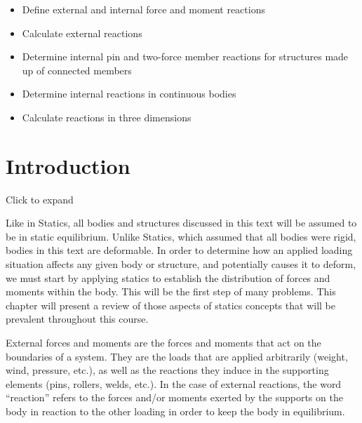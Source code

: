 \documentclass[
  letterpaper,
  DIV=11,
  numbers=noendperiod]{scrreprt}
\providecommand{\tightlist}{%
  \setlength{\itemsep}{0pt}\setlength{\parskip}{0pt}}\usepackage{longtable,booktabs,array}
\theoremstyle{definition}
\theoremstyle{remark}
\begin{document}
\begin{tcolorbox}[enhanced jigsaw, leftrule=.75mm, bottomrule=.15mm, opacityback=0, opacitybacktitle=0.6, colframe=quarto-callout-note-color-frame, toprule=.15mm, colbacktitle=quarto-callout-note-color!10!white, coltitle=black, bottomtitle=1mm, title={Learning Objectives}, titlerule=0mm, toptitle=1mm, colback=white, rightrule=.15mm, left=2mm, arc=.35mm, breakable]

\begin{itemize}
\tightlist
\item
  Define external and internal force and moment reactions
\item
  Calculate external reactions
\item
  Determine internal pin and two-force member reactions for structures
  made up of connected members
\item
  Determine internal reactions in continuous bodies
\item
  Calculate reactions in three dimensions
\end{itemize}

\end{tcolorbox}

\section*{Introduction}\label{introduction}


Click to expand

Like in Statics, all bodies and structures discussed in this text will
be assumed to be in static equilibrium. Unlike Statics, which assumed
that all bodies were rigid, bodies in this text are deformable. In order
to determine how an applied loading situation affects any given body or
structure, and potentially causes it to deform, we must start by
applying statics to establish the distribution of forces and moments
within the body. This will be the first step of many problems. This
chapter will present a review of those aspects of statics concepts that
will be prevalent throughout this course.

External forces and moments are the forces and moments that act on the
boundaries of a system. They are the loads that are applied arbitrarily
(weight, wind, pressure, etc.), as well as the reactions they induce in
the supporting elements (pins, rollers, welds, etc.). In the case of
external reactions, the word ``reaction'' refers to the forces and/or
moments exerted by the supports on the body in reaction to the other
loading in order to keep the body in equilibrium.
\end{document}
